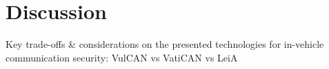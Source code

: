 
\section{Discussion}
\label{sec:discussion}

Key trade-offs \& considerations on the presented technologies for in-vehicle
communication security: VulCAN vs VatiCAN vs LeiA

